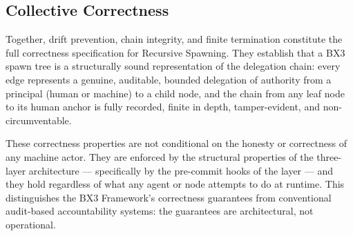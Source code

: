 \subsection{Collective Correctness}
\label{sec:rs-collective-correctness}

Together, drift prevention, chain integrity, and finite termination constitute the
full correctness specification for Recursive Spawning.  They establish that a BX3
spawn tree is a structurally sound representation of the delegation chain: every
edge represents a genuine, auditable, bounded delegation of authority from a
principal (human or machine) to a child node, and the chain from any leaf node to
its human anchor is fully recorded, finite in depth, tamper-evident, and
non-circumventable.

These correctness properties are not conditional on the honesty or correctness of
any machine actor.  They are enforced by the structural properties of the
three-layer architecture — specifically by the pre-commit hooks of the \fact{}
layer — and they hold regardless of what any agent or node attempts to do at
runtime.  This distinguishes the BX3 Framework's correctness guarantees from
conventional audit-based accountability systems: the guarantees are architectural,
not operational.
